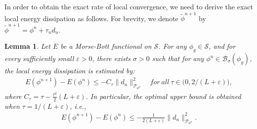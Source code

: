 \documentclass[preprint,3p]{elsarticle}
\newtheorem{lemma}{Lemma}[section]
\begin{document}
In order to obtain the exact rate of local convergence, we need to derive the exact local energy dissipation as follows. For brevity, we denote $\widetilde{\phi}^{n+1}$ by $\widetilde{\phi}^{n+1}=\phi^n+\tau_nd_n$.
\begin{lemma}\label{C_t}
	Let $E$ be a
	Morse-Bott functional on $\mathcal{S}$. For any $\phi_g\in\mathcal{S}$, and for every sufficiently small $\varepsilon>0$, there exists $\sigma>0$ such that for any {$\phi^n \in \mathcal{B}_{\sigma}(\phi_g)$}, the local energy dissipation is estimated by:
	\begin{align*}
		E(\phi^{n+1})-E(\phi^n)\le-C_\tau\|d_n\|^2_{\mathcal{P}_{\phi^n}}\quad for\ all\  \tau\in\big(0,2/(L+\varepsilon)\big),
	\end{align*} 
	where 
	$C_{\tau}=\tau-\frac{\tau^2}{2}(L+\varepsilon)$.
	In particular, the optimal upper bound is obtained when $\tau=1/(L+\varepsilon)$, i.e.,
	\begin{align*}
		E(\phi^{n+1})-E(\phi^n)\le-\frac{1}{2(L+\varepsilon)}\|d_n\|^2_{\mathcal{P}_{\phi^n}}.
	\end{align*} 
\end{lemma}
\end{document}

